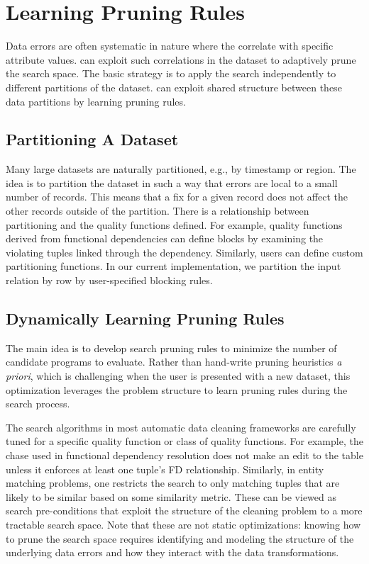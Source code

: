 \section{Learning Pruning Rules}
Data errors are often systematic in nature where the correlate with specific attribute values.
\sys can exploit such correlations in the dataset to adaptively prune the search space.
The basic strategy is to apply the search independently to different partitions of the dataset.
\sys can exploit shared structure between these data partitions by learning pruning rules.

\subsection{Partitioning A Dataset}
Many large datasets are naturally partitioned, e.g., by timestamp or region. 
The idea is to partition the dataset in such a way that errors are local to a small number of records.
This means that a fix for a given record does not affect the other records outside of the partition.
There is a relationship between partitioning and the quality functions defined.
For example, quality functions derived from functional dependencies can define blocks by examining the violating tuples linked through the dependency.  Similarly, users can define custom partitioning functions.  In our current implementation, we partition the input relation by row by user-specified blocking rules.

\subsection{Dynamically Learning Pruning Rules}\label{s:dynlearn}
The main idea is to develop search pruning rules to minimize the number of candidate programs to evaluate.  Rather than hand-write pruning heuristics {\it a priori}, which is challenging when the user is presented with a new dataset, this optimization leverages the problem structure to learn pruning rules during the search process.


The search algorithms in  most automatic data cleaning frameworks are carefully tuned for a specific quality function or class of quality functions. For example, the chase used in functional dependency resolution does not make an edit to the table unless it enforces at least one tuple's FD relationship.    Similarly, in entity matching problems, one restricts the search to only matching tuples that are likely to be similar based on some similarity metric.
These can be viewed as search pre-conditions that exploit the structure of the cleaning problem to a more tractable search space.
Note that these are not static optimizations: knowing how to prune the search space requires identifying and modeling the structure of the underlying data errors and how they interact with the data transformations.


